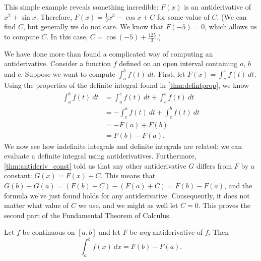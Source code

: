 This simple example reveals something incredible: $F(x)$ is an antiderivative of $x^2+\sin x$. Therefore, $F(x) = \frac13x^3-\cos x+C$ for some value of $C$. (We can find $C$, but generally we do not care. We know that $F(-5)=0$, which allows us to compute $C$. In this case, $C=\cos(-5)+\frac{125}3$.)

We have done more than found a complicated way of computing an antiderivative. Consider a function $f$ defined on an open interval containing $a$, $b$ and $c$. Suppose we want to compute $\int_a^b f(t)\ dt$. First, let $F(x) = \int_c^x f(t)\ dt$. Using the properties of the definite integral found in \autoref{thm:defintprop}, we know 
\begin{align*}
	\int_a^b f(t)\ dt
	&= \int_a^c f(t)\ dt + \int_c^b f(t)\ dt \\
	&= -\int_c^a f(t)\ dt + \int_c^b f(t)\ dt \\
	&=-F(a) + F(b)\\
	&= F(b) - F(a).
\end{align*}
We now see how indefinite integrals and definite integrals are related: we can evaluate a definite integral using antiderivatives.  Furthermore, \autoref{thm:antideriv_const} told us that any other antiderivative $G$ differs from $F$ by a constant: $G(x)=F(x)+C$.  This means that $G(b)-G(a)=(F(b)+C)-(F(a)+C)=F(b)-F(a)$, and the formula we've just found holds for any antiderivative.  Consequently, it does not matter what value of $C$ we use, and we might as well let $C=0$. This proves the second part of the Fundamental Theorem of Calculus.

\begin{theorem}\label{thm:FTC2}
Let $f$ be continuous on $[a,b]$ and let $F$ be \emph{any} antiderivative of $f$. Then \[\int_a^b f(x)\ dx = F(b) - F(a).\]
\end{theorem}


